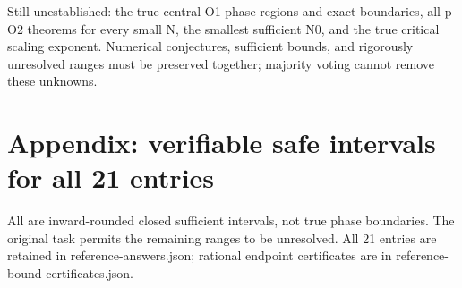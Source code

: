 \documentclass[11pt,a4paper]{article}
\begin{document}
Still unestablished: the true central O1 phase regions and exact boundaries, all-p O2 theorems for every small N, the smallest sufficient N0, and the true critical scaling exponent. Numerical conjectures, sufficient bounds, and rigorously unresolved ranges must be preserved together; majority voting cannot remove these unknowns.


\section*{Appendix: verifiable safe intervals for all 21 entries}

All are inward-rounded closed sufficient intervals, not true phase boundaries. The original task permits the remaining ranges to be unresolved. All 21 entries are retained in reference-answers.json; rational endpoint certificates are in reference-bound-certificates.json.
\end{document}
